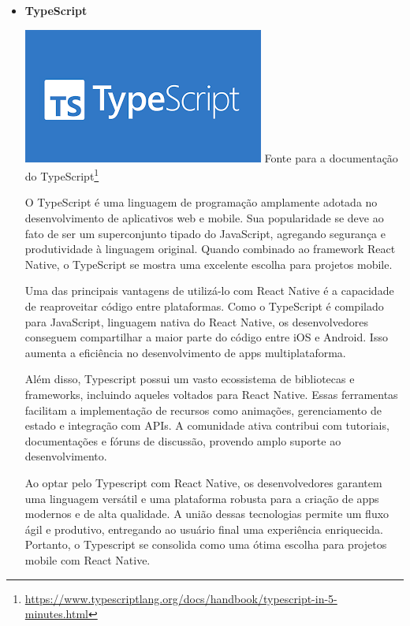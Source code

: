 \begin{itemize}
\begin{itemize}
\begin{itemize}
    \item \textbf{TypeScript}
    \begin{center}
    \includegraphics[width=0.5\linewidth]{figuras/Tecnologies/TypeScript.png}
    \label{fig:TypeScript}
    Fonte para a documentação do TypeScript\footnote{\url{https://www.typescriptlang.org/docs/handbook/typescript-in-5-minutes.html}}
\end{center}

O TypeScript é uma linguagem de programação amplamente adotada no desenvolvimento de aplicativos web e mobile. Sua popularidade se deve ao fato de ser um superconjunto tipado do JavaScript, agregando segurança e produtividade à linguagem original. Quando combinado ao framework React Native, o TypeScript se mostra uma excelente escolha para projetos mobile.

Uma das principais vantagens de utilizá-lo com React Native é a capacidade de reaproveitar código entre plataformas. Como o TypeScript é compilado para JavaScript, linguagem nativa do React Native, os desenvolvedores conseguem compartilhar a maior parte do código entre iOS e Android. Isso aumenta a eficiência no desenvolvimento de apps multiplataforma.

Além disso, Typescript possui um vasto ecossistema de bibliotecas e frameworks, incluindo aqueles voltados para React Native. Essas ferramentas facilitam a implementação de recursos como animações, gerenciamento de estado e integração com APIs. A comunidade ativa contribui com tutoriais, documentações e fóruns de discussão, provendo amplo suporte ao desenvolvimento.

Ao optar pelo Typescript com React Native, os desenvolvedores garantem uma linguagem versátil e uma plataforma robusta para a criação de apps modernos e de alta qualidade. A união dessas tecnologias permite um fluxo ágil e produtivo, entregando ao usuário final uma experiência enriquecida. Portanto, o Typescript se consolida como uma ótima escolha para projetos mobile com React Native.


\end{itemize}
\end{itemize}
\end{itemize}
